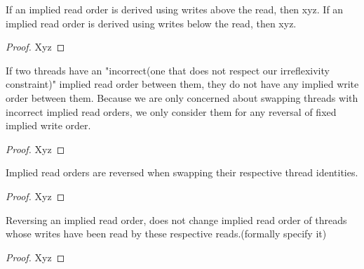         \begin{property}
            \label{inf-iwo}
            If an implied read order is derived using writes above the read, then xyz.
            If an implied read order is derived using writes below the read, then xyz.
        \end{property}

        \begin{proof}
            Xyz
        \end{proof}

        \begin{property}
            \label{iro-no-iwo}
            If two threads have an "incorrect(one that does not respect our irreflexivity constraint)" implied read order between them, they do not     have any implied write order between them. 
            Because we are only concerned about swapping threads with incorrect implied read orders, we only consider them for any reversal of fixed    implied write order.     
        \end{property}

        \begin{proof}
            Xyz
        \end{proof}

        \begin{property}
            \label{iro-Rev}
            Implied read orders are reversed when swapping their respective thread identities.
        \end{property}

        \begin{proof}
            Xyz
        \end{proof}

        \begin{property}
            \label{iro-partial-stability}
            Reversing an implied read order, does not change implied read order of threads whose writes have been read by these respective reads.(formally specify it)
        \end{property}

        \begin{proof}
            Xyz
        \end{proof}

